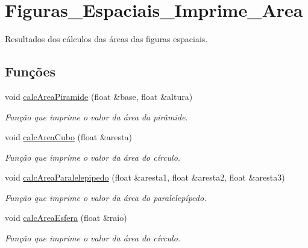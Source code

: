 \hypertarget{group__Figuras__Espaciais__Imprime__Area}{}\section{Figuras\+\_\+\+Espaciais\+\_\+\+Imprime\+\_\+\+Area}
\label{group__Figuras__Espaciais__Imprime__Area}


Resultados dos cálculos das áreas das figuras espaciais.  


\subsection*{Funções}
\begin{DoxyCompactItemize}
\item 
void \hyperlink{group__Figuras__Espaciais__Imprime__Area_gae484b707bcee07b0c5580440923326aa}{calc\+Area\+Piramide} (float \&base, float \&altura)
\begin{DoxyCompactList}\small\item\em Função que imprime o valor da área da pirâmide. \end{DoxyCompactList}\item 
void \hyperlink{group__Figuras__Espaciais__Imprime__Area_ga54aa7364c2caf59fa3d1b1b303901050}{calc\+Area\+Cubo} (float \&aresta)
\begin{DoxyCompactList}\small\item\em Função que imprime o valor da área do círculo. \end{DoxyCompactList}\item 
void \hyperlink{group__Figuras__Espaciais__Imprime__Area_ga153e7a3b91362f17f7f22919dde85ebc}{calc\+Area\+Paralelepipedo} (float \&aresta1, float \&aresta2, float \&aresta3)
\begin{DoxyCompactList}\small\item\em Função que imprime o valor da área do paralelepípedo. \end{DoxyCompactList}\item 
void \hyperlink{group__Figuras__Espaciais__Imprime__Area_ga3a49e8821532ada5f803c815f8d99825}{calc\+Area\+Esfera} (float \&raio)
\begin{DoxyCompactList}\small\item\em Função que imprime o valor da área do círculo. \end{DoxyCompactList}\end{DoxyCompactItemize}


